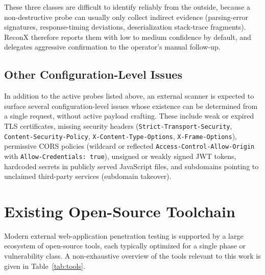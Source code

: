 These three classes are difficult to identify reliably from the outside, because a non-destructive probe can usually only collect indirect evidence (parsing-error signatures, response-timing deviations, deserialization stack-trace fragments). ReconX therefore reports them with low to medium confidence by default, and delegates aggressive confirmation to the operator's manual follow-up.

\subsection{Other Configuration-Level Issues}

In addition to the active probes listed above, an external scanner is expected to surface several configuration-level issues whose existence can be determined from a single request, without active payload crafting. These include weak or expired TLS certificates, missing security headers (\texttt{Strict-Transport-Security}, \texttt{Content-Security-Policy}, \texttt{X-Content-Type-Options}, \texttt{X-Frame-Options}), permissive CORS policies (wildcard or reflected \texttt{Access-Control-Allow-Origin} with \texttt{Allow-Credentials: true}), unsigned or weakly signed JWT tokens, hardcoded secrets in publicly served JavaScript files, and subdomains pointing to unclaimed third-party services (subdomain takeover).

\section{Existing Open-Source Toolchain}
\label{sec:toolchain}

Modern external web-application penetration testing is supported by a large ecosystem of open-source tools, each typically optimized for a single phase or vulnerability class. A non-exhaustive overview of the tools relevant to this work is given in Table~\ref{tab:tools}.

